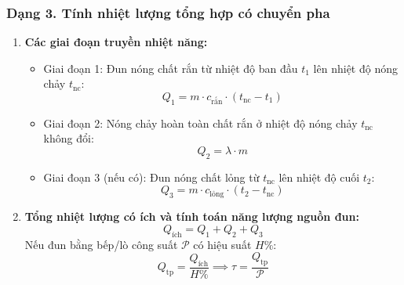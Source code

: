 \subsubsection{Dạng 3. Tính nhiệt lượng tổng hợp có chuyển pha}
\begin{phuongphap}
\begin{enumerate}
\item \textbf{Các giai đoạn truyền nhiệt năng:}
\begin{itemize}
    \item Giai đoạn 1: Đun nóng chất rắn từ nhiệt độ ban đầu $t_1$ lên nhiệt độ nóng chảy $t_{\text{nc}}$:
    \[
    Q_1 = m \cdot c_{\text{rắn}} \cdot (t_{\text{nc}} - t_1)
    \]
    \item Giai đoạn 2: Nóng chảy hoàn toàn chất rắn ở nhiệt độ nóng chảy $t_{\text{nc}}$ không đổi:
    \[
    Q_2 = \lambda \cdot m
    \]
    \item Giai đoạn 3 (nếu có): Đun nóng chất lỏng từ $t_{\text{nc}}$ lên nhiệt độ cuối $t_2$:
    \[
    Q_3 = m \cdot c_{\text{lỏng}} \cdot (t_2 - t_{\text{nc}})
    \]
\end{itemize}
\item \textbf{Tổng nhiệt lượng có ích và tính toán năng lượng nguồn đun:}
\[
Q_{\text{ích}} = Q_1 + Q_2 + Q_3
\]
Nếu đun bằng bếp/lò công suất $\mathscr{P}$ có hiệu suất $H\%$:
\[
Q_{\text{tp}} = \dfrac{Q_{\text{ích}}}{H\%} \implies \tau = \dfrac{Q_{\text{tp}}}{\mathscr{P}}
\]
\end{enumerate}
\end{phuongphap}

